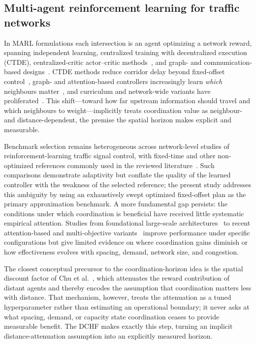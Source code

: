 \documentclass[review,12pt]{elsarticle}
\begin{document}
\subsection{Multi-agent reinforcement learning for traffic networks}
\label{subsec:lit_marl}

In MARL formulations each intersection is an agent optimizing a network reward, spanning independent learning, centralized training with decentralized execution (CTDE), centralized-critic actor--critic methods~\cite{yu2022surprising}, and graph- and communication-based designs~\cite{analcbazzan2008,ammarhaydari2022,noaeen2022reinforcement}. CTDE methods reduce corridor delay beyond fixed-offset control~\cite{zhang2022distributed}, graph- and attention-based controllers increasingly learn \emph{which} neighbours matter~\cite{taowang2024,chengdongma2024}, and curriculum and network-wide variants have proliferated~\cite{xuesili2023,fuyueren2023,jiefang2023}. This shift---toward how far upstream information should travel and which neighbours to weight---implicitly treats coordination value as neighbour- and distance-dependent, the premise the spatial horizon makes explicit and measurable.

Benchmark selection remains heterogeneous across network-level studies of reinforcement-learning traffic signal control, with fixed-time and other non-optimized references commonly used in the reviewed literature~\cite{noaeen2022reinforcement}. Such comparisons demonstrate adaptivity but conflate the quality of the learned controller with the weakness of the selected reference; the present study addresses this ambiguity by using an exhaustively swept optimized fixed-offset plan as the primary approximation benchmark. A more fundamental gap persists: the conditions under which coordination is beneficial have received little systematic empirical attention. Studies from foundational large-scale architectures~\cite{chu2019multi} to recent attention-based and multi-objective variants~\cite{andechang2024,jia2025multi,nie2025cmrm,huang2026robust} improve performance under specific configurations but give limited evidence on where coordination gains diminish or how effectiveness evolves with spacing, demand, network size, and congestion.

The closest conceptual precursor to the coordination-horizon idea is the spatial discount factor of Chu et al.~\cite{chu2019multi}, which attenuates the reward contribution of distant agents and thereby encodes the assumption that coordination matters less with distance. That mechanism, however, treats the attenuation as a tuned hyperparameter rather than estimating an operational boundary; it never asks at what spacing, demand, or capacity state coordination ceases to provide measurable benefit. The DCHF makes exactly this step, turning an implicit distance-attenuation assumption into an explicitly measured horizon.
\end{document}
